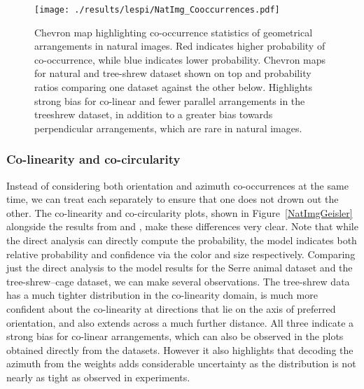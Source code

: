 \begin{figure}
	\centering
        \texttt{[image: ./results/lespi/NatImg\_Cooccurrences.pdf]}
	\caption[Chevron map highlighting co-occurrence statistics of
      geometrical arrangements in natural images.]{Chevron map
      highlighting co-occurrence statistics of geometrical
      arrangements in natural images. Red indicates higher probability
      of co-occurrence, while blue indicates lower
      probability. Chevron maps for natural and tree-shrew dataset
      shown on top and probability ratios comparing one dataset
      against the other below. Highlights strong bias for co-linear
      and fewer parallel arrangements in the treeshrew dataset, in
      addition to a greater bias towards perpendicular arrangements,
      which are rare in natural images. }
	\label{NatImgCooccurrences}
\end{figure}

\subsubsection*{Co-linearity and co-circularity}

Instead of considering both orientation and azimuth co-occurrences at
the same time, we can treat each separately to ensure that one does
not drown out the other. The co-linearity and co-circularity plots,
shown in Figure~\ref{NatImgGeisler} alongside the results from
\cite{Geisler2001} and \cite{Perrinet2015}, make these differences
very clear. Note that while the direct analysis can directly compute
the probability, the model indicates both relative probability and
confidence via the color and size respectively. Comparing just the
direct analysis to the model results for the Serre animal dataset and
the tree-shrew--cage dataset, we can make several observations. The
tree-shrew data has a much tighter distribution in the co-linearity
domain, is much more confident about the co-linearity at directions
that lie on the axis of preferred orientation, and also extends across
a much further distance. All three indicate a strong bias for
co-linear arrangements, which can also be observed in the plots
obtained directly from the datasets. However it also highlights that
decoding the azimuth from the weights adds considerable uncertainty as
the distribution is not nearly as tight as observed in experiments.

